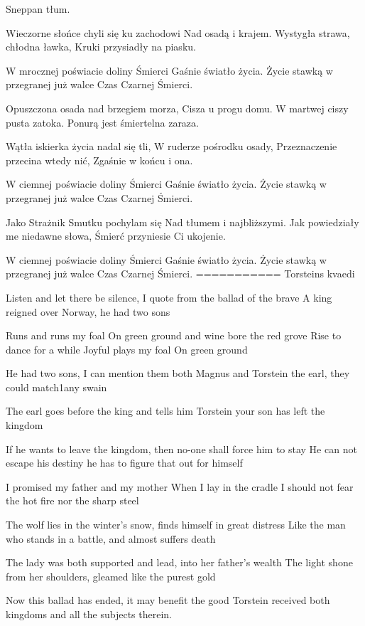 Sneppan tłum.

Wieczorne słońce chyli się ku zachodowi
Nad osadą i krajem.
Wystygła strawa, chłodna ławka,
Kruki przysiadły na piasku.

W mrocznej poświacie doliny Śmierci
Gaśnie światło życia.
Życie stawką w przegranej już walce
Czas Czarnej Śmierci.

Opuszczona osada nad brzegiem morza,
Cisza u progu domu.
W martwej ciszy pusta zatoka.
Ponurą jest śmiertelna zaraza.

Wątła iskierka życia nadal się tli,
W ruderze pośrodku osady,
Przeznaczenie przecina wtedy nić,
Zgaśnie w końcu i ona.

W ciemnej poświacie doliny Śmierci
Gaśnie światło życia.
Życie stawką w przegranej już walce
Czas Czarnej Śmierci.

Jako Strażnik Smutku pochylam się
Nad tłumem i najbliższymi.
Jak powiedziały me niedawne słowa,
Śmierć przyniesie Ci ukojenie.

W ciemnej poświacie doliny Śmierci
Gaśnie światło życia.
Życie stawką w przegranej już walce
Czas Czarnej Śmierci.
===========
Torsteins kvaedi

Listen and let there be silence,
I quote from the ballad of the brave
A king reigned over Norway, he had two sons
 
Runs and runs my foal
On green ground and wine bore the red grove
Rise to dance for a while
Joyful plays my foal
On green ground
 
He had two sons, I can mention them both
Magnus and Torstein the earl,
they could match1any swain
 
The earl goes before the king and tells him
Torstein your son has left the kingdom
 
If he wants to leave the kingdom,
then no-one shall force him to stay
He can not escape his destiny
he has to figure that out for himself
 
I promised my father and my mother
When I lay in the cradle
I should not fear the hot fire
nor the sharp steel
 
The wolf lies in the winter's snow,
finds himself in great distress
Like the man who stands in a battle,
and almost suffers death
 
The lady was both supported and lead,
into her father's wealth
The light shone from her shoulders,
gleamed like the purest gold
 
Now this ballad has ended,
it may benefit the good
Torstein received both kingdoms
and all the subjects therein.


